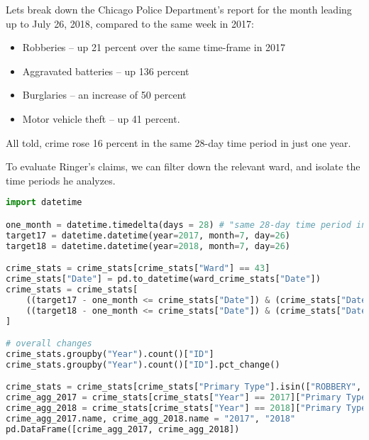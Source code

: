 \documentclass[11pt]{article}
\begin{document}
\begin{mdframed}[topline=false, bottomline=false, rightline=false,linewidth=2pt,linecolor=gray]
Let\textquotesingle s break down the Chicago Police Department’s report for the month leading up to July 26, 2018, compared to the same week in 2017:
\begin{itemize}
\item Robberies -- up 21 percent over the same time-frame in 2017
\item Aggravated batteries -- up 136 percent
\item Burglaries -- an increase of 50 percent
\item Motor vehicle theft -- up 41 percent.
\end{itemize}
All told, crime rose 16 percent in the same 28-day time period in just one year.
\end{mdframed}

To evaluate Ringer's claims, we can filter down the relevant ward, and isolate the time periods he analyzes.
\begin{lstlisting}[language=Python,numbers=none]
import datetime

one_month = datetime.timedelta(days = 28) # "same 28-day time period in just one year"
target17 = datetime.datetime(year=2017, month=7, day=26)
target18 = datetime.datetime(year=2018, month=7, day=26)

crime_stats = crime_stats[crime_stats["Ward"] == 43]
crime_stats["Date"] = pd.to_datetime(ward_crime_stats["Date"])
crime_stats = crime_stats[
    ((target17 - one_month <= crime_stats["Date"]) & (crime_stats["Date"] <= target17)) | 
    ((target18 - one_month <= crime_stats["Date"]) & (crime_stats["Date"] <= target18))
]

# overall changes
crime_stats.groupby("Year").count()["ID"]
crime_stats.groupby("Year").count()["ID"].pct_change()

crime_stats = crime_stats[crime_stats["Primary Type"].isin(["ROBBERY", "BATTERY", "BURGLARY", "MOTOR VEHICLE THEFT"])]
crime_agg_2017 = crime_stats[crime_stats["Year"] == 2017]["Primary Type"].value_counts()
crime_agg_2018 = crime_stats[crime_stats["Year"] == 2018]["Primary Type"].value_counts()
crime_agg_2017.name, crime_agg_2018.name = "2017", "2018"
pd.DataFrame([crime_agg_2017, crime_agg_2018])
\end{lstlisting}
\end{document}
